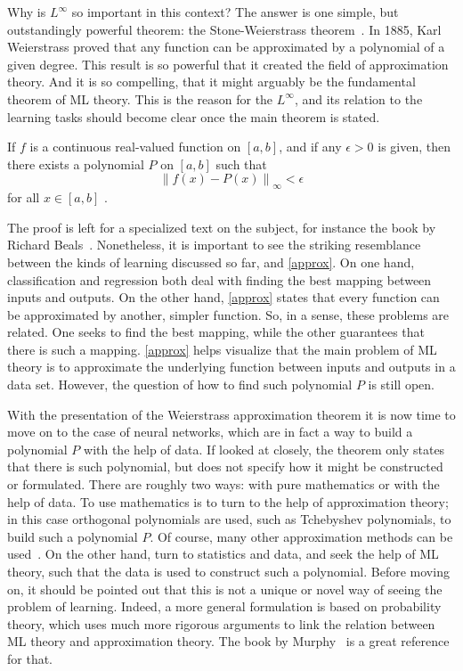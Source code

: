 Why is $L^{\infty}$ so important in this context? The answer is one simple, but outstandingly powerful theorem: the Stone-Weierstrass theorem~\cite{stoneApplicationsTheoryBoolean1937, stoneGeneralizedWeierstrassApproximation1948}. In 
1885, Karl Weierstrass proved that any function can be approximated by a polynomial of a 
given degree. This result is so powerful that it created the field of approximation theory. 
And it is so compelling, that it might arguably be the fundamental theorem of ML theory. 
This is the reason for the \(L^{\infty}\), and its relation to the learning tasks should 
become clear once the main theorem is stated.
\begin{theorem}
    If \(f\) is a continuous real-valued function on \([a, b]\), and if any \(\epsilon > 0\) is given, then there exists a polynomial \(P\) on \([a, b]\) such that
    \[
        { \left\lVert f(x) - P(x) \right\rVert }_{\infty} < \epsilon
        \]
        for all \(x \in [a, b]\) .
    \label{approx}
\end{theorem}
The proof is left for a specialized text on the subject, for instance the book by Richard 
Beals~\cite{bealsAnalysisIntroduction2004}. Nonetheless, it is important to see the striking resemblance between the kinds of learning discussed so far, and \autoref{approx}.
On one hand, classification and regression both deal with finding the best mapping between 
inputs and outputs. On the other hand, \autoref{approx} states that every function can be 
approximated by another, simpler function. So, in a sense, these problems are related. One 
seeks to find the best mapping, while the other guarantees that there is such a mapping. 
\autoref{approx} helps visualize that the main problem of ML theory is to approximate the 
underlying function between inputs and outputs in a data set. However, the question of how to find such polynomial \(P\) is still open.

With the presentation of the Weierstrass approximation theorem it is now time to move on to 
the case of neural networks, which are in fact a way to build a polynomial \(P\) with the 
help of data. If looked at closely, the theorem only states that there is such polynomial, 
but does not specify how it might be constructed or formulated. There are roughly two 
ways: with pure mathematics or with the help of data. To use mathematics is to turn to the help of approximation theory; in this case 
orthogonal polynomials are used, such as Tchebyshev polynomials, to build such a polynomial 
\(P\). Of course, many other approximation methods can be used~\cite{trefethenApproximationTheoryApproximation2013}.
On the other hand, turn to 
statistics and data, and seek the help of ML theory, such that the data is used to construct
such a polynomial. Before moving on, it should be pointed out that this is not a unique or 
novel way of seeing the problem of learning. Indeed, a more general formulation is based on 
probability theory, which uses much more rigorous arguments to link the relation between ML 
theory and approximation theory. 
The book by Murphy~\cite{murphyMachineLearningProbabilistic2012} is a great reference for 
that.

